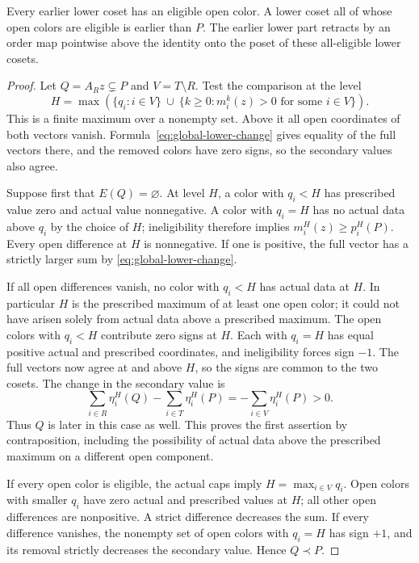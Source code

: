 \begin{lemma}\label{lem:global-lower-comparison}
Every earlier lower coset has an eligible open color.  A lower coset all
of whose open colors are eligible is earlier than $P$.  The earlier
lower part retracts by an order map pointwise above the identity onto
the poset of these all-eligible lower cosets.
\end{lemma}

\begin{proof}
Let $Q=A_Rz\subsetneq P$ and $V=T\setminus R$.  Test the comparison at
the level
\[
 H=\max\left(
    \{q_i:i\in V\}\ \cup\
    \{k\ge0:m_i^k(z)>0\text{ for some }i\in V\}
   \right).
\]
This is a finite maximum over a nonempty set.  Above it all open
coordinates of both vectors vanish.  Formula~\eqref{eq:global-lower-change}
gives equality of the full vectors there, and the removed colors have
zero signs, so the secondary values also agree.

Suppose first that $E(Q)=\varnothing$.  At level $H$, a color with
$q_i<H$ has prescribed value zero and actual value nonnegative.  A color
with $q_i=H$ has no actual data above $q_i$ by the choice of $H$;
ineligibility therefore implies $m_i^H(z)\ge p_i^H(P)$.  Every open
difference at $H$ is nonnegative.  If one is positive, the full vector
has a strictly larger sum by \eqref{eq:global-lower-change}.

If all open differences vanish, no color with $q_i<H$ has actual data
at $H$.  In particular $H$ is the prescribed maximum of at least one
open color; it could not have arisen solely from actual data above a
prescribed maximum.  The open colors with $q_i<H$ contribute zero signs
at $H$.  Each with $q_i=H$ has equal positive actual and prescribed
coordinates, and ineligibility forces sign $-1$.  The full vectors now
agree at and above $H$, so the signs are common to the two cosets.  The
change in the secondary value is
\[
 \sum_{i\in R}\eta_i^H(Q)-\sum_{i\in T}\eta_i^H(P)
       =-\sum_{i\in V}\eta_i^H(P)>0.
\]
Thus $Q$ is later in this case as well.  This proves the first assertion
by contraposition, including the possibility of actual data above the
prescribed maximum on a different open component.

If every open color is eligible, the actual caps imply
$H=\max_{i\in V}q_i$.  Open colors with smaller $q_i$ have zero actual
and prescribed values at $H$; all other open differences are
nonpositive.  A strict difference decreases the sum.  If every
difference vanishes, the nonempty set of open colors with $q_i=H$ has
sign $+1$, and its removal strictly decreases the secondary value.
Hence $Q\prec P$.


\end{proof}
